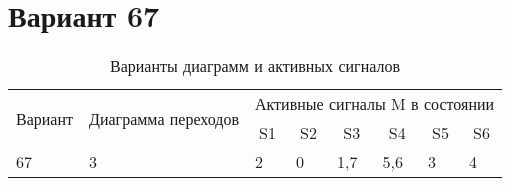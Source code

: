 \documentclass[a4paper, 14pt]{article}
\begin{document}
    \section*{Вариант 67}
    \begin{table}[H]
        \caption{Варианты диаграмм и активных сигналов}
        \begin{tabular}{|c|c|c|l|l|l|l|l|}
            \hline
            \multirow{2}{*}{Вариант} & \multirow{2}{*}{Диаграмма переходов} & \multicolumn{6}{c|}{Активные сигналы M в состоянии}                                                                                                      \\ \cline{3-8} 
                                     &                                      & S1                     & \multicolumn{1}{c|}{S2} & \multicolumn{1}{c|}{S3} & \multicolumn{1}{c|}{S4} & \multicolumn{1}{c|}{S5} & \multicolumn{1}{c|}{S6} \\ \hline
            \multicolumn{1}{|l|}{67} & \multicolumn{1}{l|}{3}               & \multicolumn{1}{l|}{2} & 0                       & 1,7                     & 5,6                     & 3                       & 4                       \\ \hline
        \end{tabular}
    \end{table}
\end{document}
